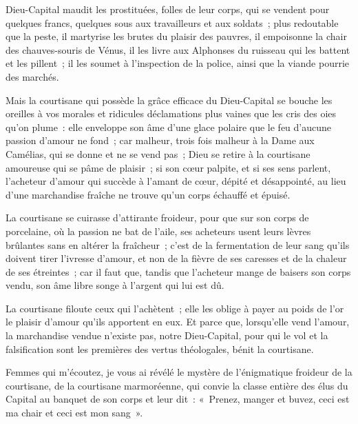 \documentclass[french,twoside]{book} %
\begin{document}
Dieu-Capital maudit les prostituées, folles de leur corps, qui se vendent pour quelques francs, quelques sous aux travailleurs et aux soldats ; plus redoutable que la peste, il martyrise les brutes du plaisir des pauvres, il empoisonne la chair des chauves-souris de Vénus, il les livre aux Alphonses du ruisseau qui les battent et les pillent ; il les soumet à l’inspection de la police, ainsi que la viande pourrie des marchés.\par
Mais la courtisane qui possède la grâce efficace du Dieu-Capital se bouche les oreilles à vos morales et ridicules déclamations plus vaines que les cris des oies qu’on plume : elle enveloppe son âme d’une glace polaire que le feu d’aucune passion d’amour ne fond ; car malheur, trois fois malheur à la Dame aux Camélias, qui se donne et ne se vend pas ; Dieu se retire à la courtisane amoureuse qui se pâme de plaisir ; si son cœur palpite, et si ses sens parlent, l’acheteur d’amour qui succède à l’amant de cœur, dépité et désappointé, au lieu d’une marchandise fraîche ne trouve qu’un corps échauffé et épuisé.\par
La courtisane se cuirasse d’attirante froideur, pour que sur son corps de porcelaine, où la passion ne bat de l’aile, ses acheteurs usent leurs lèvres brûlantes sans en altérer la fraîcheur ; c’est de la fermentation de leur sang qu’ils doivent tirer l’ivresse d’amour, et non de la fièvre de ses caresses et de la chaleur de ses étreintes ; car il faut que, tandis que l’acheteur mange de baisers son corps vendu, son âme libre songe à l’argent qui lui est dû.\par
La courtisane filoute ceux qui l’achètent ; elle les oblige à payer au poids de l’or le plaisir d’amour qu’ils apportent en eux. Et parce que, lorsqu’elle vend l’amour, la marchandise vendue n’existe pas, notre Dieu-Capital, pour qui le vol et la falsification sont les premières des vertus théologales, bénit la courtisane.\par
Femmes qui m’écoutez, je vous ai révélé le mystère de l’énigmatique froideur de la courtisane, de la courtisane marmoréenne, qui convie la classe entière des élus du Capital au banquet de son corps et leur dit : « Prenez, manger et buvez, ceci est ma chair et ceci est mon sang ».\par

\begin{center}
\noindent *\par
\end{center}
\end{document}
